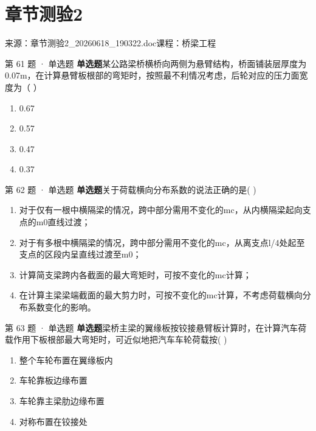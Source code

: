 \documentclass[UTF8,zihao=-4,openany]{ctexbook}
\newenvironment{choices}{\begin{enumerate}[label=\Alph*.,leftmargin=9mm,labelsep=3mm,itemsep=2pt,topsep=4pt]}{\end{enumerate}}
\newcommand{\qtype}[1]{\textcolor{brand}{\sffamily\bfseries #1}}
\newcommand{\sourcefile}[1]{\textcolor{muted}{\small\sffamily 来源：#1}}
\begin{document}
\chapter{章节测验2}

\sourcefile{章节测验2\_20260618\_190322.doc}\quad \textcolor{muted}{\small\sffamily 课程：桥梁工程}

\begin{questionbox}{第 61 题 · 单选题}
\qtype{单选题}\quad 某公路梁桥横桥向两侧为悬臂结构，桥面铺装层厚度为0.07m，在计算悬臂板根部的弯矩时，按照最不利情况考虑，后轮对应的压力面宽度为（ ）
\begin{choices}
\item 0.67
\item 0.57
\item 0.47
\item 0.37
\end{choices}
\end{questionbox}

\begin{questionbox}{第 62 题 · 单选题}
\qtype{单选题}\quad 关于荷载横向分布系数的说法正确的是( )
\begin{choices}
\item 对于仅有一根中横隔梁的情况，跨中部分需用不变化的mc，从内横隔梁起向支点的m0直线过渡；
\item 对于有多根中横隔梁的情况，跨中部分需用不变化的mc，从离支点l/4处起至支点的区段内呈直线过渡至m0；
\item 计算简支梁跨内各截面的最大弯矩时，可按不变化的mc计算；
\item 在计算主梁梁端截面的最大剪力时，可按不变化的mc计算，不考虑荷载横向分布系数变化的影响。
\end{choices}
\end{questionbox}

\begin{questionbox}{第 63 题 · 单选题}
\qtype{单选题}\quad 梁桥主梁的翼缘板按铰接悬臂板计算时，在计算汽车荷载作用下板根部最大弯矩时，可近似地把汽车车轮荷载按( )
\begin{choices}
\item 整个车轮布置在翼缘板内
\item 车轮靠板边缘布置
\item 车轮靠主梁肋边缘布置
\item 对称布置在铰接处
\end{choices}
\end{questionbox}
\end{document}
